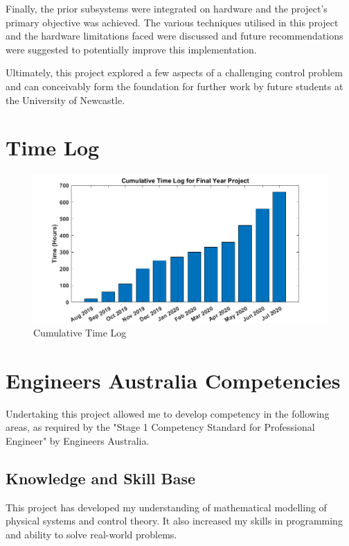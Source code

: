 \documentclass{UoNMCHA}
\numberwithin{equation}{section}
\begin{document}
Finally, the prior subsystems were integrated on hardware and the project's primary objective was achieved. The various techniques utilised in this project and the hardware limitations faced were discussed and future recommendations were suggested to potentially improve this implementation.\

Ultimately, this project explored a few aspects of a challenging control problem and can conceivably form the foundation for further work by future students at the University of Newcastle. 



\newpage

\newpage
\appendix

\section{Time Log}\label{Time Log}

\begin{figure}[H]
	\begin{center}
		\includegraphics[width=1\linewidth]{Figures/TimeLog}
		\caption{Cumulative Time Log}
		\label{fig:TimeLog}
	\end{center}
\end{figure}

\section{Engineers Australia Competencies}
Undertaking this project allowed me to develop competency in the following areas, as required by the "Stage 1 Competency Standard for Professional Engineer" by Engineers Australia.
\subsection{Knowledge and Skill Base} 
This project has developed my understanding of mathematical modelling of physical systems and control theory. It also increased my skills in programming and ability to solve real-world problems.
\end{document}
